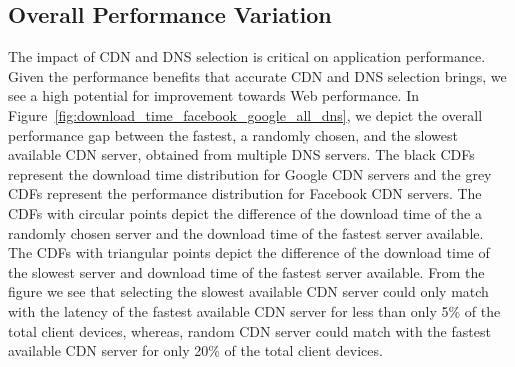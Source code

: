 \documentclass{llncs}
\begin{document}
\subsection{Overall Performance Variation}

The impact of CDN and DNS selection is critical on application performance.
Given the performance benefits that accurate CDN and DNS selection brings, we see a high potential for improvement towards Web performance.
In Figure~\ref{fig:download_time_facebook_google_all_dns}, we depict the overall performance gap between the fastest, a randomly chosen, and the slowest available CDN server, obtained from multiple DNS servers. 
The black CDFs represent the download time distribution for Google CDN servers and the grey CDFs represent the performance distribution for Facebook CDN servers.
The CDFs with circular points depict the difference of the download time of the a randomly chosen server and the download time of the fastest server available.
The CDFs with triangular points depict the difference of the download time of the slowest server and download time of the fastest server available. 
From the figure we see that selecting the slowest available CDN server could only match with the latency of the fastest available CDN server for less than only 5\% of the total client devices, whereas, random CDN server could match with the fastest available CDN server for only 20\% of the total client devices.

\end{document}
